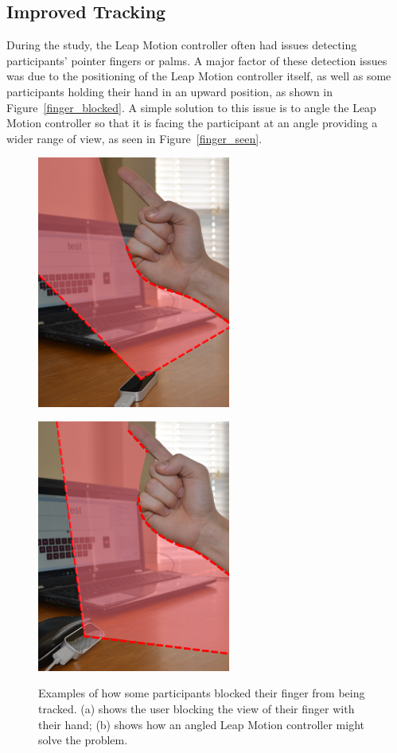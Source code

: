 \subsection{Improved Tracking}
During the study, the Leap Motion controller often had issues detecting participants' pointer fingers or palms. A major factor of these detection issues was due to the positioning of the Leap Motion controller itself, as well as some participants holding their hand in an upward position, as shown in Figure~\ref{finger_blocked}. A simple solution to this issue is to angle the Leap Motion controller so that it is facing the participant at an angle providing a wider range of view, as seen in Figure~\ref{finger_seen}.

\begin{figure}[!t]
	\centering
	\begin{minipage}[t]{2.5in}
		\includegraphics[width=2.5in]{Figures/fig_blocking}
		\label{finger_blocked}
	\end{minipage}
	\begin{minipage}[t]{2.5in}
		\includegraphics[width=2.5in]{Figures/fig_angled}
		\label{finger_seen}
	\end{minipage}
	\caption[Blocking Problem]{Examples of how some participants blocked their finger from being tracked. (a) shows the user blocking the view of their finger with their hand; (b) shows how an angled Leap Motion controller might solve the problem.}
	\label{blocking problem}
\end{figure}

